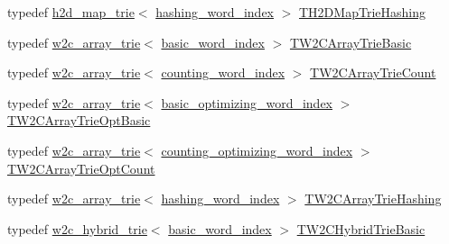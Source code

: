 \begin{DoxyCompactItemize}
\item 
typedef \hyperlink{classuva_1_1smt_1_1bpbd_1_1server_1_1lm_1_1h2d__map__trie}{h2d\+\_\+map\+\_\+trie}$<$ \hyperlink{classuva_1_1smt_1_1bpbd_1_1server_1_1lm_1_1dictionary_1_1hashing__word__index}{hashing\+\_\+word\+\_\+index} $>$ \hyperlink{namespaceuva_1_1smt_1_1bpbd_1_1server_1_1lm_afebd21cb9a426954aecb066ea8272cf9}{T\+H2\+D\+Map\+Trie\+Hashing}
\item 
typedef \hyperlink{classuva_1_1smt_1_1bpbd_1_1server_1_1lm_1_1w2c__array__trie}{w2c\+\_\+array\+\_\+trie}$<$ \hyperlink{classuva_1_1smt_1_1bpbd_1_1server_1_1lm_1_1dictionary_1_1basic__word__index}{basic\+\_\+word\+\_\+index} $>$ \hyperlink{namespaceuva_1_1smt_1_1bpbd_1_1server_1_1lm_a0ff9ccd8ef0d75734e4823d7da6d1c50}{T\+W2\+C\+Array\+Trie\+Basic}
\item 
typedef \hyperlink{classuva_1_1smt_1_1bpbd_1_1server_1_1lm_1_1w2c__array__trie}{w2c\+\_\+array\+\_\+trie}$<$ \hyperlink{classuva_1_1smt_1_1bpbd_1_1server_1_1lm_1_1dictionary_1_1counting__word__index}{counting\+\_\+word\+\_\+index} $>$ \hyperlink{namespaceuva_1_1smt_1_1bpbd_1_1server_1_1lm_a80173bfa2d9877705cbdea563f932ee3}{T\+W2\+C\+Array\+Trie\+Count}
\item 
typedef \hyperlink{classuva_1_1smt_1_1bpbd_1_1server_1_1lm_1_1w2c__array__trie}{w2c\+\_\+array\+\_\+trie}$<$ \hyperlink{namespaceuva_1_1smt_1_1bpbd_1_1server_1_1lm_1_1dictionary_a3001583c904eec702b4a4125082a7ecd}{basic\+\_\+optimizing\+\_\+word\+\_\+index} $>$ \hyperlink{namespaceuva_1_1smt_1_1bpbd_1_1server_1_1lm_a5b81ed7605907b5c0f90b9f86b8a32b4}{T\+W2\+C\+Array\+Trie\+Opt\+Basic}
\item 
typedef \hyperlink{classuva_1_1smt_1_1bpbd_1_1server_1_1lm_1_1w2c__array__trie}{w2c\+\_\+array\+\_\+trie}$<$ \hyperlink{namespaceuva_1_1smt_1_1bpbd_1_1server_1_1lm_1_1dictionary_a61cbd647b15de785ccf4cdd26661c366}{counting\+\_\+optimizing\+\_\+word\+\_\+index} $>$ \hyperlink{namespaceuva_1_1smt_1_1bpbd_1_1server_1_1lm_a68fd75184c9fd7f75b30d5b6c0724a8d}{T\+W2\+C\+Array\+Trie\+Opt\+Count}
\item 
typedef \hyperlink{classuva_1_1smt_1_1bpbd_1_1server_1_1lm_1_1w2c__array__trie}{w2c\+\_\+array\+\_\+trie}$<$ \hyperlink{classuva_1_1smt_1_1bpbd_1_1server_1_1lm_1_1dictionary_1_1hashing__word__index}{hashing\+\_\+word\+\_\+index} $>$ \hyperlink{namespaceuva_1_1smt_1_1bpbd_1_1server_1_1lm_ab3c0d99d3a11f3d2ae2e42126db080c3}{T\+W2\+C\+Array\+Trie\+Hashing}
\item 
typedef \hyperlink{classuva_1_1smt_1_1bpbd_1_1server_1_1lm_1_1w2c__hybrid__trie}{w2c\+\_\+hybrid\+\_\+trie}$<$ \hyperlink{classuva_1_1smt_1_1bpbd_1_1server_1_1lm_1_1dictionary_1_1basic__word__index}{basic\+\_\+word\+\_\+index} $>$ \hyperlink{namespaceuva_1_1smt_1_1bpbd_1_1server_1_1lm_a4113d4b6465f3f52c777cd02a6127488}{T\+W2\+C\+Hybrid\+Trie\+Basic}

\end{DoxyCompactItemize}

